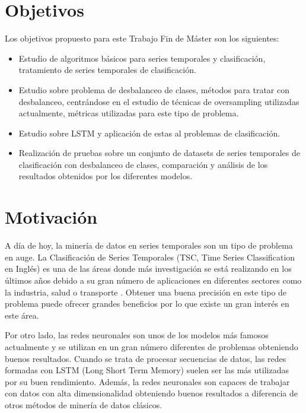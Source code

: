 \section{Objetivos}
Los objetivos propuesto para este Trabajo Fin de Máster son los siguientes:

\begin{itemize}
	\item Estudio de algoritmos básicos para series temporales y clasificación, tratamiento de series temporales de clasificación.
	\item Estudio sobre problema de desbalanceo de clases, métodos para tratar con desbalanceo, centrándose en el estudio de técnicas de oversampling utilizadas actualmente, métricas utilizadas para este tipo de problema.
	\item Estudio sobre LSTM y aplicación de estas al problemas de clasificación.
	\item Realización de pruebas sobre un conjunto de datasets de series temporales de clasificación con desbalanceo de clases, comparación y análisis de los resultados obtenidos por los diferentes modelos.
\end{itemize}
\section{Motivación}
A día de hoy, la minería de datos en series temporales son un tipo de problema en auge. La Clasificación de Series Temporales (TSC, Time Series Classification en Inglés) es una de las áreas donde más investigación se está realizando en los últimos años debido a su gran número de aplicaciones en diferentes sectores como la industria, salud o transporte \cite{cao2013integrated} \cite{cao2014parsimonious} \cite{he2017uncertainty} \cite{xu2018spatio} \cite{roychoudhury2017cost} \cite{liang2013effective} \cite{geng2018cost}. Obtener una buena precisión en este tipo de problema puede ofrecer grandes beneficios por lo que existe un gran interés en este área.\newline

Por otro lado, las redes neuronales son unos de los modelos más famosos actualmente \cite{chung2015gated} \cite{cho2014properties} \cite{karim2017lstm} \cite{swapna2018automated} y se utilizan en un gran número diferentes de problemas obteniendo buenos resultados. Cuando se trata de procesar secuencias de datos, las redes formadas con LSTM (Long Short Term Memory) suelen ser las más utilizadas por su buen rendimiento.  Además, la redes neuronales son capaces de trabajar con datos con alta dimensionalidad obteniendo buenos resultados a diferencia de otros métodos de minería de datos clásicos. \newline

